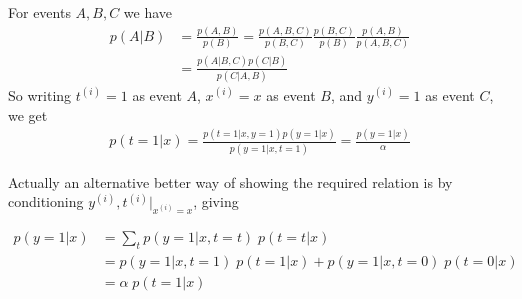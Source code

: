%
%
\begin{answer}
For events $A,B,C$ we have
\begin{align*}
p(A|B) &= \frac{p(A,B)}{p(B)} = \frac{p(A,B,C)}{p(B,C)} \frac{p(B,C)}{p(B)} \frac{p(A,B)}{p(A,B,C)}\\
	&= \frac{p(A|B,C) p(C|B)}{p(C|A,B)}
\end{align*}
So writing $t^{(i)} = 1$ as event $A$, $x^{(i)} = x$ as event $B$, and $y^{(i)} = 1$ as event $C$, we get
\begin{align*}
p(t=1|x) = \frac{p(t=1|x,y=1) p(y=1 | x)}{p(y=1 | x, t=1)} = \frac{p(y=1 | x)}{\alpha}
\end{align*}

Actually an alternative better way of showing the required relation is by conditioning $y^{(i)},t^{(i)}|_{x^{(i)}=x}$, giving 

\begin{align*}
p(y=1|x)
	&= \sum_t p(y=1|x, t=t)\; p(t=t | x) \\
	&= p(y=1|x, t=1)\; p(t=1|x) + p(y=1|x, t=0)\;p(t=0|x)\\
	&= \alpha\; p(t=1|x)
\end{align*}
\end{answer}
%